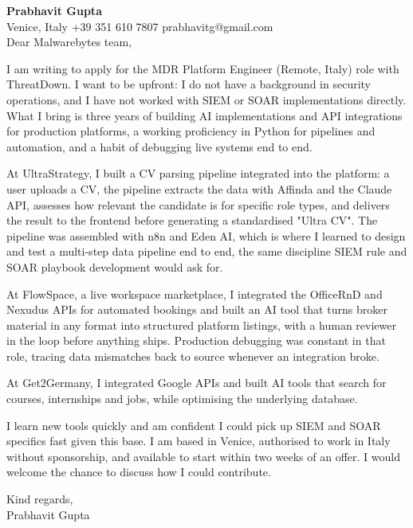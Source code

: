 \documentclass[a4paper,10.5pt]{article}
\begin{document}
\textbf{Prabhavit Gupta}\\
Venice, Italy \textbar{} +39 351 610 7807 \textbar{} prabhavitg@gmail.com\\[10pt]
Dear Malwarebytes team,

I am writing to apply for the MDR Platform Engineer (Remote, Italy) role with ThreatDown. I want to be upfront: I do not have a background in security operations, and I have not worked with SIEM or SOAR implementations directly. What I bring is three years of building AI implementations and API integrations for production platforms, a working proficiency in Python for pipelines and automation, and a habit of debugging live systems end to end.

At UltraStrategy, I built a CV parsing pipeline integrated into the platform: a user uploads a CV, the pipeline extracts the data with Affinda and the Claude API, assesses how relevant the candidate is for specific role types, and delivers the result to the frontend before generating a standardised "Ultra CV". The pipeline was assembled with n8n and Eden AI, which is where I learned to design and test a multi-step data pipeline end to end, the same discipline SIEM rule and SOAR playbook development would ask for.

At FlowSpace, a live workspace marketplace, I integrated the OfficeRnD and Nexudus APIs for automated bookings and built an AI tool that turns broker material in any format into structured platform listings, with a human reviewer in the loop before anything ships. Production debugging was constant in that role, tracing data mismatches back to source whenever an integration broke.

At Get2Germany, I integrated Google APIs and built AI tools that search for courses, internships and jobs, while optimising the underlying database.

I learn new tools quickly and am confident I could pick up SIEM and SOAR specifics fast given this base. I am based in Venice, authorised to work in Italy without sponsorship, and available to start within two weeks of an offer. I would welcome the chance to discuss how I could contribute.

Kind regards,\\
Prabhavit Gupta
\end{document}
